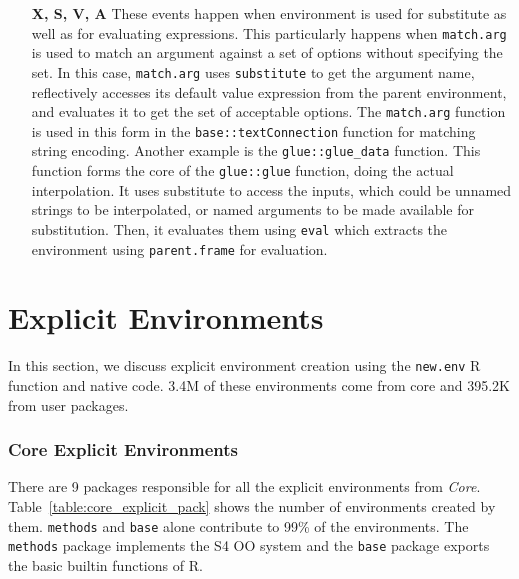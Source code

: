 \documentclass[10pt,review,sigplan,anonymous=true,authorversion=true,nonacm=true]{acmart}
\newcommand{\code}[1]{\lstinline |#1|\xspace}
\newcommand{\newEnv}{\code{new.env}}
\begin{document}
\begin{itemize}
\item[\textbf{X, S, V, A}] These events happen when environment is used for
  substitute as well as for evaluating expressions. This particularly happens
  when \code{match.arg} is used to match an argument against a set of options
  without specifying the set. In this case, \code{match.arg} uses
  \code{substitute} to get the argument name, reflectively accesses its default
  value expression from the parent environment, and evaluates it to get the set
  of acceptable options. The \code{match.arg} function is used in this form in
  the \code{base::textConnection} function for matching string encoding. Another
  example is the \code{glue::glue_data} function. This function forms the core
  of the \code{glue::glue} function, doing the actual interpolation. It uses
  substitute to access the inputs, which could be unnamed strings to be
  interpolated, or named arguments to be made available for substitution. Then,
  it evaluates them using \code{eval} which extracts the environment using
  \code{parent.frame} for evaluation.
\end{itemize}

\section{Explicit Environments}
In this section, we discuss explicit environment creation using the \newEnv R
function and native code. 3.4M of these environments come from core and 395.2K
from user packages.

\subsubsection{Core Explicit Environments}

There are 9 packages responsible for all the explicit environments from
\emph{Core}. Table~\ref{table:core_explicit_pack} shows the number of
environments created by them. \code{methods} and \code{base} alone contribute to
99\% of the environments. The \code{methods} package implements the S4 OO system
and the \code{base} package exports the basic builtin functions of R.
\end{document}
